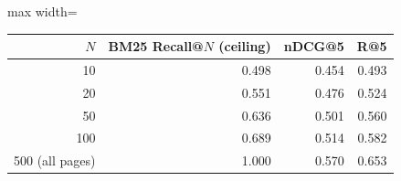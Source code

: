 \begin{adjustbox}{max width=\linewidth}
\begin{tabular}{rrrr}
\toprule
$N$ & BM25 Recall@$N$ (ceiling) & nDCG@5 & R@5 \\
\midrule
10 & 0.498 & 0.454 & 0.493 \\
20 & 0.551 & 0.476 & 0.524 \\
50 & 0.636 & 0.501 & 0.560 \\
100 & 0.689 & 0.514 & 0.582 \\
500 (all pages) & 1.000 & 0.570 & 0.653 \\
\bottomrule
\end{tabular}
\end{adjustbox}
\par{}
